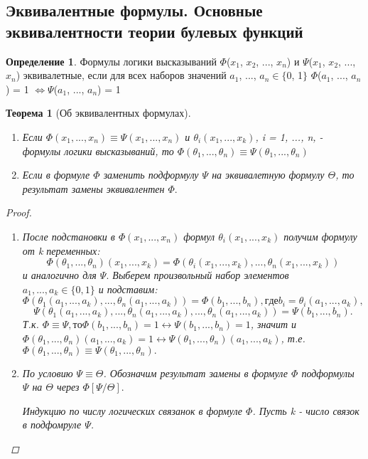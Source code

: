 \documentclass[a4paper]{article}
\newtheorem{theorem}{Теорема}[section]
\theoremstyle{definition}
\newtheorem*{definition}{Определение}
\theoremstyle{remark}
\begin{document}
    \subsection{Эквивалентные формулы. Основные эквивалентности теории булевых функций}
	\begin{definition}
		Формулы логики высказываний 	$\Phi$($x_1$, $x_2$, ..., $x_n$) и $\Psi$($x_1$, $x_2$, ..., $x_n$) эквивалетные, если для всех наборов значений $a_1$, ..., $a_n\in\{$0, 1$\}$
		$\Phi$($a_1$, ..., $a_n$) = 1 $\Leftrightarrow \Psi$($a_1$, ..., $a_n$) = 1
	\end{definition}
    \begin{theorem}[Об эквивалентных формулах]


        \begin{enumerate}
           	\item Если $\Phi(x_1, ..., x_n) \equiv \Psi(x_1, ..., x_n)$ и $\theta_i(x_1, ..., x_k)$, i = 1, ..., n, - формулы логики высказываний, то $\Phi(\theta_1, ..., \theta_n) \equiv \Psi(\theta_1, ..., \theta_n)$
		\item Если в формуле $\Phi$ заменить подформулу $\Psi$ на эквивалетную формулу $\Theta$, то результат замены эквивалентен $\Phi.$
        \end{enumerate}
	\begin{proof}
		\begin{enumerate}
			\item После подстановки в $\Phi(x_1, ..., x_n)$ формул $\theta_i(x_1, ..., x_k)$ получим формулу от k переменных: $$\Phi(\theta_1, ..., \theta_n)(x_1, ..., x_k) = \Phi(\theta_i(x_1, ..., x_k), ..., \theta_n(x_1, ..., x_k))$$ и аналогично для $\Psi.$ Выберем произвольный набор элементов $a_1, ..., a_k \in \{0, 1\}$ и подставим: $$\Phi(\theta_1(a_1, ..., a_k), ..., \theta_n(a_1, ..., a_k)) = \Phi(b_1, ..., b_n), где b_i = \theta_i(a_1, ..., a_k),$$ $$\Psi(\theta_1(a_1, ..., a_k), ..., \theta_n(a_1, ..., a_k), ..., \theta_n(a_1, ..., a_k)) = \Psi(b_1, ..., b_n).$$ Т.к. $\Phi \equiv \Psi, то \Phi(b_1, ..., b_n) = 1 \leftrightarrow \Psi(b_1, ..., b_n) = 1$, значит и $\Phi(\theta_1, ..., \theta_n)(a_1, ..., a_k) = 1 \leftrightarrow \Psi(\theta_1, ..., \theta_n)(a_1, ..., a_k)$, т.е. $\Phi(\theta_1, ..., \theta_n) \equiv \Psi(\theta_1, ..., \theta_n).$
			\item По условию $\Psi \equiv \Theta$. Обозначим результат замены в формуле $\Phi$ подформулы $\Psi$ на $\Theta$ через $\Phi[\Psi/\Theta].$

				Индукцию по числу логических связанок в формуле $\Phi$. Пусть k - число связок в подфомруле $\Psi$.


\end{enumerate}
\end{proof}
\end{theorem}
\end{document}
